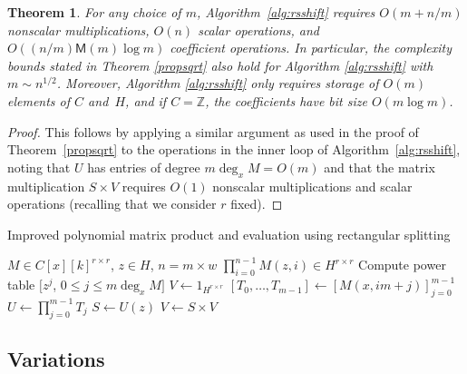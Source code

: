 \documentclass{sig-alternate}
\newtheorem{theorem}{Theorem}
\newcommand   \M      {\mathsf{M}}
\begin{document}
\begin{theorem}
For any choice of $m$, Algorithm~\ref{alg:rsshift} requires
$O(m + n/m)$ nonscalar multiplications,
$O(n)$ scalar operations, and $O((n/m) \M(m) \log m)$ coefficient operations.
In particular, the complexity bounds stated in Theorem \ref{propsqrt}
also hold for Algorithm \ref{alg:rsshift} with $m \sim n^{1/2}$.
Moreover, Algorithm \ref{alg:rsshift} only
requires storage of $O(m)$ elements of $C$ and~$H$,
and if $C = \mathbb{Z}$, the coefficients have bit size $O(m \log m)$.
\end{theorem}

\begin{proof}
This follows by applying a similar argument as used in the proof of
Theorem~\ref{propsqrt}
to the operations in the inner loop of Algorithm~\ref{alg:rsshift},
noting that $U$ has entries of degree $m \deg_x M = O(m)$
and that the matrix multiplication $S \times V$
requires $O(1)$ nonscalar multiplications and scalar
operations (recalling that we consider $r$ fixed).
\end{proof}

\begin{algorithm}
  \caption{Improved polynomial matrix product and evaluation using rectangular splitting}
  \label{alg:rsshift}
  \begin{algorithmic}[1]
    \Require $M \in C[x][k]^{r \times r}$, $z \in H$, $n = m \times w$
    \Ensure $\prod_{i=0}^{n-1} M(z,i) \in H^{r \times r}$
    \State Compute power table $[z^j$, $0 \le j \le m \deg_x M]$
    \State $V \gets 1_{H^{r\times r}}$ 
        \State $[T_0, \ldots, T_{m-1}] \gets [M(x,im+j)]_{j=0}^{m-1}$
        \Statex {}
        \State $U \gets \prod_{j=0}^{m-1} T_j$ 
        \State $S \gets U(z)$ 
        \State $V \gets S \times V$ 
    \EndFor
    \State {}
  \end{algorithmic}
\end{algorithm}

\subsection{Variations}
\end{document}
